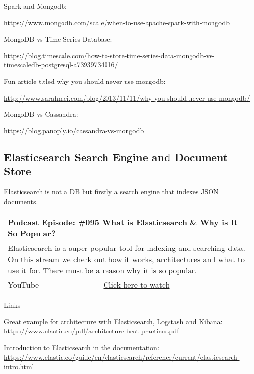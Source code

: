 \documentclass[12pt, numbers=noenddot]{scrreprt} %
\begin{document}
Spark and Mongodb:

\url{https://www.mongodb.com/scale/when-to-use-apache-spark-with-mongodb}
 
MongoDB vs Time Series Database:

\url{https://blog.timescale.com/how-to-store-time-series-data-mongodb-vs-timescaledb-postgresql-a73939734016/}
 
Fun article titled why you should never use mongodb:

\url{http://www.sarahmei.com/blog/2013/11/11/why-you-should-never-use-mongodb/}
 
MongoDB vs Cassandra:

\url{https://blog.panoply.io/cassandra-vs-mongodb}

\subsection{Elasticsearch Search Engine and Document Store}

Elasticsearch is not a DB but firstly a search engine that indexes JSON documents.

\begin{table}[htbp]
\begin{tabular}{ll}
\hline
\multicolumn{2}{l}{\textbf{Podcast Episode:} \#095 What is Elasticsearch \& Why is It So Popular?} \\ \hline
\multicolumn{2}{p{15cm}}{Elasticsearch is a super popular tool for indexing and searching data. On this stream we check out how it works, architectures and what to use it for. There must be a reason why it is so popular.}         \\ \hline
\multicolumn{1}{l|}{YouTube}   & \href{https://youtu.be/hNb5zB4OPXM}{Click here to watch}   \\  \hline
\end{tabular}
\end{table}

Links:

Great example for architecture with Elasticsearch, Logstash and Kibana: \\
\url{https://www.elastic.co/pdf/architecture-best-practices.pdf}

Introduction to Elasticsearch in the documentation: \\
\url{https://www.elastic.co/guide/en/elasticsearch/reference/current/elasticsearch-intro.html}
\end{document}
